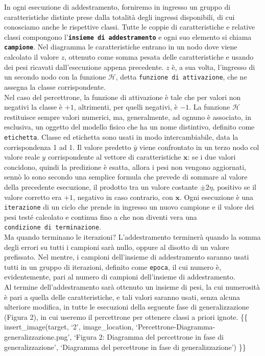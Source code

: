 \documentclass[
  letterpaper,
  DIV=11,
  numbers=noendperiod]{scrreprt}
\begin{document}
In ogni esecuzione di addestramento, forniremo in ingresso un gruppo di
caratteristiche distinte prese dalla totalità degli ingressi
disponibili, di cui conosciamo anche le rispettive classi. Tutte le
coppie di caratteristiche e relative classi compongono
l'\textbf{\texttt{insieme\ di\ addestramento}} e ogni suo elemento si
chiama \textbf{\texttt{campione}}. Nel diagramma le caratteristiche
entrano in un nodo dove viene calcolato il valore \(z\), ottenuto come
somma pesata delle caratteristiche e usando dei pesi ricavati
dall'esecuzione appena precedente. \(z\) è, a sua volta, l'ingresso di
un secondo nodo con la funzione \(\mathcal{H}\), detta
\texttt{funzione\ di\ attivazione}, che ne assegna la classe
corrispondente.\\
Nel caso del percettrone, la funzione di attivazione è tale che per
valori non negativi la classe è \(+1\), altrimenti, per quelli negativi,
è \(-1\). La funzione \(\mathcal{H}\) restituisce sempre valori
numerici, ma, generalmente, ad ognuno è associato, in esclusiva, un
oggetto del modello fisico che ha un nome distintivo, definito come
\texttt{etichetta}. Classe ed etichetta sono usati in modo
intercambiabile, data la corrispondenza 1 ad 1. Il valore predetto
\(\bar{y}\) viene confrontato in un terzo nodo col valore reale \(y\)
corrispondente al vettore di caratteristiche \(\mathbf{x}\): se i due
valori concidono, quindi la predizione è esatta, allora i pesi non
vengono aggiornati, sennò lo sono secondo una semplice formula che
prevede di sommare al valore della precedente esecuzione, il prodotto
tra un valore costante \(\pm 2\eta\), positivo se il valore corretto era
\(+1\), negativo in caso contrario, con \(\mathbf{x}\). Ogni esecuzione
è una \texttt{iterazione} di un ciclo che prende in ingresso un nuovo
campione e il valore dei pesi testé calcolato e continua fino a che non
diventi vera una \texttt{condizione\ di\ terminazione}.\\
Ma quando terminano le iterazioni? L'addestramento terminerà quando la
somma degli errori su tutti i campioni sarà nullo, oppure al disotto di
un valore prefissato. Nel mentre, i campioni dell'insieme di
addestramento saranno usati tutti in un gruppo di iterazioni, definito
come \texttt{epoca}, il cui numero è, evidentemente, pari al numero di
campioni dell'insieme di addestramento.\\
Al termine dell'addestramento sarà ottenuto un insieme di pesi, la cui
numerosità è pari a quella delle caratteristiche, e tali valori saranno
usati, senza alcuna ulteriore modifica, in tutte le esecuzioni della
seguente fase di generalizzazione (Figura 2), in cui useremo il
percettrone per ottenere classi a priori ignote. \{\{
insert\_image(target, `2', image\_location,
`Percettrone-Diagramma-generalizzazione.png', `Figura 2: Diagramma del
percettrone in fase di generalizzazione', `Diagramma del percettrone in
fase di generalizzazione') \}\}
\end{document}
